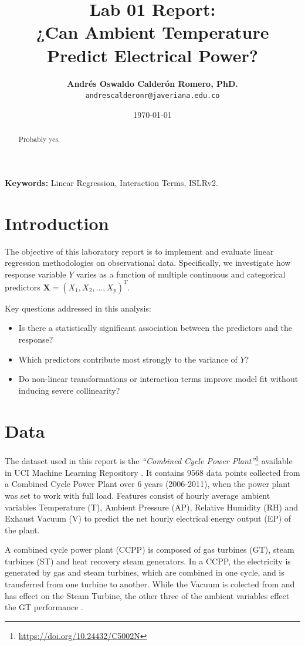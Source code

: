 \documentclass[11pt, letterpaper]{article}
\title{\Large Lab 01 Report:\\
    \Large ¿Can Ambient Temperature Predict Electrical Power?
}
\author{\textbf{Andrés Oswaldo Calderón Romero, PhD.} \\
\texttt{andrescalderonr@javeriana.edu.co}}
\date{\today}
\begin{document}
\maketitle

\begin{abstract}
Probably yes.
\end{abstract}

\textbf{Keywords:} Linear Regression, Interaction Terms, ISLRv2.

\section{Introduction}
\label{sec:intro}

The objective of this laboratory report is to implement and evaluate linear regression methodologies on observational data. Specifically, we investigate how response variable $Y$ varies as a function of multiple continuous and categorical predictors $\bm{X} = (X_1, X_2, \dots, X_p)^T$.

Key questions addressed in this analysis:
\begin{itemize}
    \item Is there a statistically significant association between the predictors and the response?
    \item Which predictors contribute most strongly to the variance of $Y$?
    \item Do non-linear transformations or interaction terms improve model fit without inducing severe collinearity?
\end{itemize}

\section{Data}
\label{sec:data}

The dataset used in this report is the \textit{``Combined Cycle Power Plant''}\footnote{\url{https://doi.org/10.24432/C5002N}} available in UCI Machine Learning Repository \parencite{kelly2023uci}.  It contains 9568 data points collected from a Combined Cycle Power Plant over 6 years (2006-2011), when the power plant was set to work with full load. Features consist of hourly average ambient variables Temperature (T), Ambient Pressure (AP), Relative Humidity (RH) and Exhaust Vacuum (V) to predict the net hourly electrical energy output (EP)  of the plant.

A combined cycle power plant (CCPP) is composed of gas turbines (GT), steam turbines (ST) and heat recovery steam generators. In a CCPP, the electricity is generated by gas and steam turbines, which are combined in one cycle, and is transferred from one turbine to another. While the Vacuum is colected from and has effect on the Steam Turbine, the other three of the ambient variables effect the GT performance \parencite{Tfekci2014PredictionOF, ccpp2014}.
\end{document}
